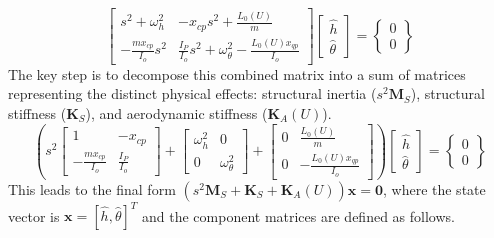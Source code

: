 \documentclass{article}
\begin{document}
\begin{equation}
\begin{bmatrix}
s^2 + \omega_h^2 & -x_{cp}s^2 + \frac{L_0(U)}{m} \\
-\frac{m x_{cp}}{I_o}s^2 & \frac{I_P}{I_o}s^2 + \omega_\theta^2 - \frac{L_0(U)x_{qp}}{I_o}
\end{bmatrix}
\begin{bmatrix} \hat{h} \\ \hat{\theta} \end{bmatrix} =
\begin{Bmatrix} 0 \\ 0 \end{Bmatrix}
\label{eq:matrix_system}
\end{equation}
The key step is to decompose this combined matrix into a sum of matrices representing the distinct physical effects: structural inertia ($s^2 \mathbf{M}_S$), structural stiffness ($\mathbf{K}_S$), and aerodynamic stiffness ($\mathbf{K}_A(U)$).
\begin{equation}
\left( s^2 \begin{bmatrix} 1 & -x_{cp} \\ -\frac{m x_{cp}}{I_o} & \frac{I_P}{I_o} \end{bmatrix} + \begin{bmatrix} \omega_h^2 & 0 \\ 0 & \omega_\theta^2 \end{bmatrix} + \begin{bmatrix} 0 & \frac{L_0(U)}{m} \\ 0 & -\frac{L_0(U) x_{qp}}{I_o} \end{bmatrix} \right) \begin{bmatrix} \hat{h} \\ \hat{\theta} \end{bmatrix} = \begin{Bmatrix} 0 \\ 0 \end{Bmatrix}
\label{eq:matrix_decomposition}
\end{equation}
This leads to the final form $(s^2 \mathbf{M}_S + \mathbf{K}_S + \mathbf{K}_A(U)) \mathbf{x} = \mathbf{0}$, where the state vector is $\mathbf{x} = [\hat{h}, \hat{\theta}]^T$ and the component matrices are defined as follows.
\end{document}
